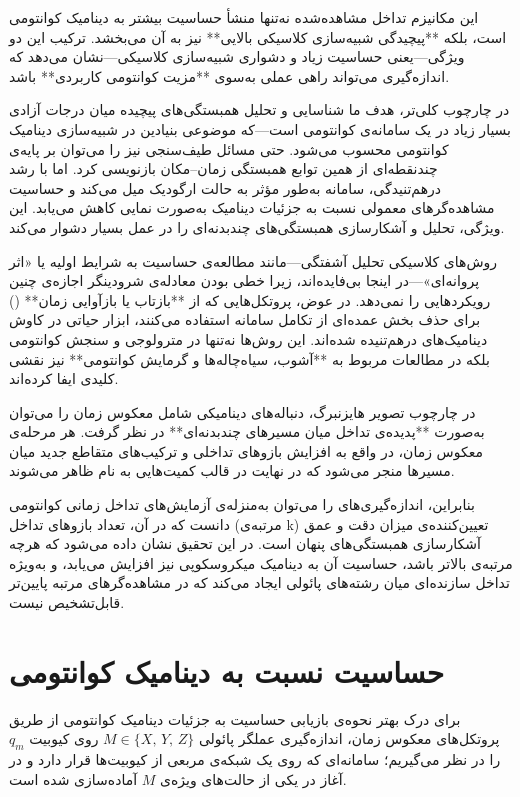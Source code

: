 این مکانیزم تداخل مشاهده‌شده نه‌تنها منشأ حساسیت بیشتر  به دینامیک کوانتومی است، بلکه **پیچیدگی شبیه‌سازی کلاسیکی بالایی** نیز به آن می‌بخشد. ترکیب این دو ویژگی—یعنی حساسیت زیاد و دشواری شبیه‌سازی کلاسیکی—نشان می‌دهد که اندازه‌گیری  می‌تواند راهی عملی به‌سوی **مزیت کوانتومی کاربردی** باشد.

در چارچوب کلی‌تر، هدف ما شناسایی و تحلیل همبستگی‌های پیچیده میان درجات آزادی بسیار زیاد در یک سامانه‌ی کوانتومی است—که موضوعی بنیادین در شبیه‌سازی دینامیک کوانتومی محسوب می‌شود. حتی مسائل طیف‌سنجی نیز را می‌توان بر پایه‌ی چند‌نقطه‌ای از همین توابع همبستگی زمان–مکان بازنویسی کرد. اما با رشد درهم‌تنیدگی، سامانه به‌طور مؤثر به حالت ارگودیک میل می‌کند و حساسیت مشاهده‌گرهای معمولی نسبت به جزئیات دینامیک به‌صورت نمایی کاهش می‌یابد. این ویژگی، تحلیل و آشکارسازی همبستگی‌های چندبدنه‌ای را در عمل بسیار دشوار می‌کند.

روش‌های کلاسیکی تحلیل آشفتگی—مانند مطالعه‌ی حساسیت به شرایط اولیه یا «اثر پروانه‌ای»—در اینجا بی‌فایده‌اند، زیرا خطی بودن معادله‌ی شرودینگر اجازه‌ی چنین رویکردهایی را نمی‌دهد. در عوض، پروتکل‌هایی که از **بازتاب یا بازآوایی زمان** () برای حذف بخش عمده‌ای از تکامل سامانه استفاده می‌کنند، ابزار حیاتی در کاوش دینامیک‌های درهم‌تنیده شده‌اند. این روش‌ها نه‌تنها در مترو‌لوجی و سنجش کوانتومی بلکه در مطالعات مربوط به **آشوب، سیاه‌چاله‌ها و گرمایش کوانتومی** نیز نقشی کلیدی ایفا کرده‌اند.

در چارچوب تصویر هایزنبرگ، دنباله‌های دینامیکی شامل معکوس زمان را می‌توان به‌صورت **پدیده‌ی تداخل میان مسیرهای چندبدنه‌ای** در نظر گرفت. هر مرحله‌ی معکوس زمان، در واقع به افزایش بازوهای تداخلی و ترکیب‌های متقاطع جدید میان مسیرها منجر می‌شود که در نهایت در قالب کمیت‌هایی به نام  ظاهر می‌شوند. 

بنابراین، اندازه‌گیری‌های  را می‌توان به‌منزله‌ی آزمایش‌های تداخل زمانی کوانتومی دانست که در آن، تعداد بازوهای تداخل (مرتبه‌ی k) تعیین‌کننده‌ی میزان دقت و عمق آشکارسازی همبستگی‌های پنهان است. در این تحقیق نشان داده می‌شود که هرچه مرتبه‌ی  بالاتر باشد، حساسیت آن به دینامیک میکروسکوپی نیز افزایش می‌یابد، و به‌ویژه  تداخل سازنده‌ای میان رشته‌های پائولی ایجاد می‌کند که در مشاهده‌گرهای مرتبه‌ پایین‌تر قابل‌تشخیص نیست.


\section{حساسیت  نسبت به دینامیک کوانتومی}
\label{sec:sensitivity}

برای درک بهتر نحوه‌ی بازیابی حساسیت به جزئیات دینامیک کوانتومی از طریق پروتکل‌های معکوس زمان، اندازه‌گیری عملگر پائولی 
\( M \in \{X,\, Y,\, Z\} \) 
روی کیوبیت \( q_m \) را در نظر می‌گیریم؛ سامانه‌ای که روی یک شبکه‌ی مربعی از کیوبیت‌ها قرار دارد و در آغاز در یکی از حالت‌های ویژه‌ی \( M \) آماده‌سازی شده است. 

